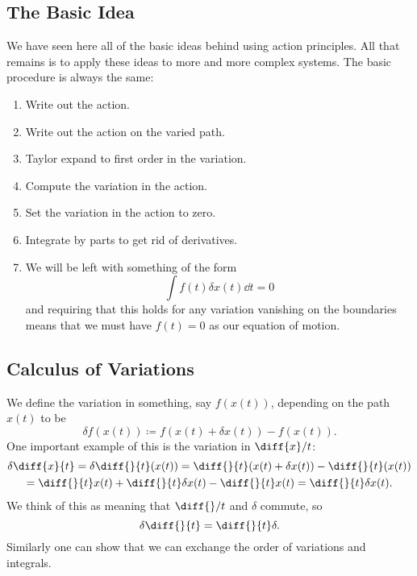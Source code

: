 \documentclass[fleqn]{NotesClass}
\begin{document}
    \subsection{The Basic Idea}
    We have seen here all of the basic ideas behind using action principles.
    All that remains is to apply these ideas to more and more complex systems.
    The basic procedure is always the same:
    \begin{enumerate}
        \item Write out the action.
        \item Write out the action on the varied path.
        \item Taylor expand to first order in the variation.
        \item Compute the variation in the action.
        \item Set the variation in the action to zero.
        \item Integrate by parts to get rid of derivatives.
        \item We will be left with something of the form
        \begin{equation}
            \int f(t) \delta x(t) \dd{t} = 0
        \end{equation}
        and requiring that this holds for any variation vanishing on the boundaries means that we must have \(f(t) = 0\) as our equation of motion.
    \end{enumerate}
    
    \subsection{Calculus of Variations}
    We define the variation in something, say \(f(x(t))\), depending on the path \(x(t)\) to be
    \begin{equation}
        \delta f(x(t)) \coloneqq f(x(t) + \delta x(t)) - f(x(t)).
    \end{equation}
    One important example of this is the variation in \(\diff{x}/{t}\):
    \begin{multline}
        \delta \diff{x}{t} = \delta \diff{}{t}(x(t)) = \diff{}{t}(x(t) + \delta x(t)) - \diff{}{t}(x(t))\\
        = \diff{}{t}x(t) + \diff{}{t}\delta x(t) - \diff{}{t} x(t) = \diff{}{t} \delta x(t).
    \end{multline}
    We think of this as meaning that \(\diff{}/{t}\) and \(\delta\) commute, so
    \begin{equation}
        \delta \diff{}{t} = \diff{}{t}\delta.
    \end{equation}
    Similarly one can show that we can exchange the order of variations and integrals.
    
\end{document}
